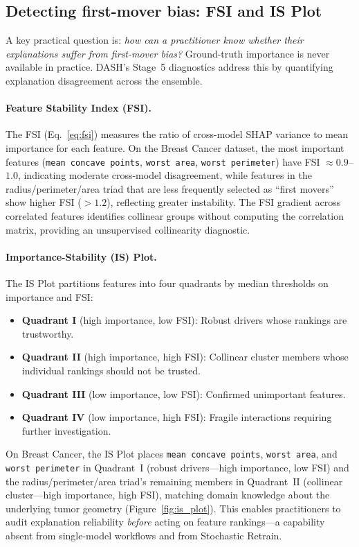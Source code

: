 \documentclass[11pt]{article}
\newcommand{\dash}{\textsc{DASH}}
\begin{document}
\subsection{Detecting first-mover bias: FSI and IS Plot}
\label{sec:diagnostics}

A key practical question is: \emph{how can a practitioner know whether
their explanations suffer from first-mover bias?} Ground-truth importance
is never available in practice. \dash{}'s Stage~5 diagnostics address this
by quantifying explanation disagreement across the ensemble.

\paragraph{Feature Stability Index (FSI).}
The FSI (Eq.~\ref{eq:fsi}) measures the ratio of cross-model SHAP
variance to mean importance for each feature. On the Breast Cancer
dataset, the most important features (\texttt{mean concave points},
\texttt{worst area}, \texttt{worst perimeter}) have FSI $\approx 0.9$--$1.0$,
indicating moderate cross-model disagreement, while features in the
radius/perimeter/area triad that are less frequently selected as
``first movers'' show higher FSI ($> 1.2$), reflecting greater
instability. The FSI gradient across correlated features
identifies collinear groups without computing the correlation matrix,
providing an unsupervised collinearity diagnostic.

\paragraph{Importance-Stability (IS) Plot.}
The IS Plot partitions features into four quadrants by median
thresholds on importance and FSI:
\begin{itemize}
  \item \textbf{Quadrant I} (high importance, low FSI): Robust
    drivers whose rankings are trustworthy.
  \item \textbf{Quadrant II} (high importance, high FSI): Collinear
    cluster members whose individual rankings should not be trusted.
  \item \textbf{Quadrant III} (low importance, low FSI): Confirmed
    unimportant features.
  \item \textbf{Quadrant IV} (low importance, high FSI): Fragile
    interactions requiring further investigation.
\end{itemize}

On Breast Cancer, the IS Plot places \texttt{mean concave points},
\texttt{worst area}, and \texttt{worst perimeter} in Quadrant~I
(robust drivers---high importance, low FSI) and the
radius/perimeter/area triad's remaining members in Quadrant~II
(collinear cluster---high importance, high FSI), matching
domain knowledge about the underlying tumor geometry
(Figure~\ref{fig:is_plot}). This enables practitioners to audit
explanation reliability \emph{before} acting on feature rankings---a
capability absent from single-model workflows and from Stochastic
Retrain.
\end{document}
